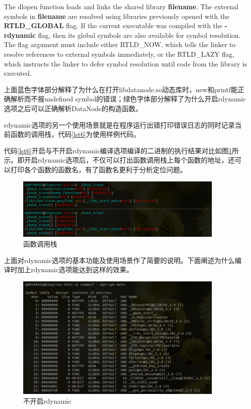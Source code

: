 \documentclass[a4paper, 12pt, titlepage]{article}
\begin{document}
The dlopen function loads and links the shared library \textbf{filename}. {\color{blue}The external symbols in \textbf{filename} are resolved using libraries previously opened with the \textbf{RTLD\_GLOBAL} flag}. {\color{green}If the current executable was compiled with the \textbf{-rdynamic} flag, then its global symbols are also available for symbol resolution}. The flag argument must include either RTLD\_NOW, which tells the linker to resolve references to external symbols immediately, or the RTLD\_LAZY flag, which instructs the linker to defer symbol resolution until code from the library is executed.

上面蓝色字体部分解释了为什么在打开libdatanode.so动态库时，new和printf能正确解析而不报undefined symbol的错误；绿色字体部分解释了为什么开启rdynamic选项之后可以正确解析DataNode的构造函数。

rdynamic选项的另一个使用场景就是在程序运行出错打印错误日志的同时记录当前函数的调用栈，代码\ref{lst6}为使用样例代码。
\begin{spacing}{1.0}
  
\end{spacing}
代码\ref{lst6}开启与不开启rdynamic编译选项编译的二进制的执行结果对比如图\ref{fig30}所示。即开启rdynamic选项后，不仅可以打出函数调用栈上每个函数的地址，还可以打印各个函数的函数名，有了函数名更利于分析定位问题。
\begin{figure}[!htb]
  \setlength{\abovecaptionskip}{0pt}
  \centering
  \includegraphics[width=0.92\textwidth]{backtrace.png}
  \caption{函数调用栈}
  \label{fig30}
\end{figure}

上面对rdynamic选项的基本功能及使用场景作了简要的说明。下面阐述为什么编译时加上rdynamic选项能达到这样的效果。
\begin{figure}[!htb]
  \setlength{\abovecaptionskip}{0pt}
  \centering
  \includegraphics[width=0.92\textwidth]{nordynamic.png}
  \caption{不开启rdynamic}
  \label{fig31}
\end{figure}
\end{document}
